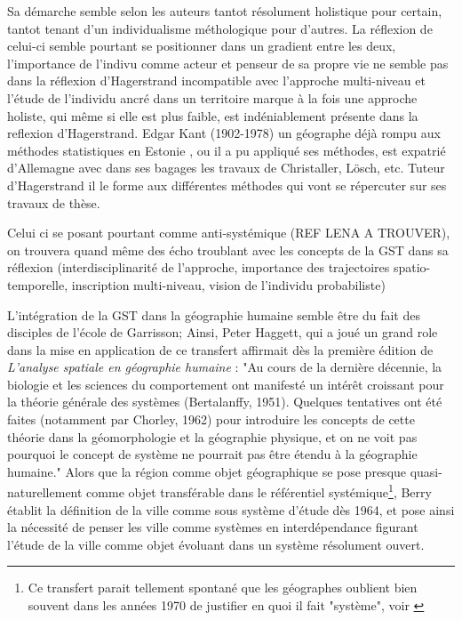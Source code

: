 {Sa démarche semble selon les auteurs tantot résolument holistique pour certain, tantot tenant d'un individualisme méthologique pour d'autres. La réflexion de celui-ci semble pourtant se positionner dans un gradient entre les deux, l'importance de l'indivu comme acteur et penseur de sa propre vie ne semble pas dans la réflexion d'Hagerstrand incompatible avec l'approche multi-niveau et l'étude de l'individu ancré dans un territoire marque à la fois une approche holiste, qui même si elle est plus faible, est indéniablement présente dans la reflexion d'Hagerstrand. Edgar Kant (1902-1978) un géographe déjà rompu aux méthodes statistiques en Estonie \autocite{Chabot1937} , ou il a pu appliqué ses méthodes, est expatrié d'Allemagne avec dans ses bagages les travaux de Christaller, Lösch, etc. Tuteur d'Hagerstrand il le forme aux différentes méthodes qui vont se répercuter sur ses travaux de thèse.

Celui ci se posant pourtant comme anti-systémique (REF LENA A TROUVER), on trouvera quand même des écho troublant avec les concepts de la GST dans sa réflexion (interdisciplinarité de l'approche, importance des trajectoires spatio-temporelle, inscription multi-niveau, vision de l'individu probabiliste)
 

L'intégration de la GST dans la géographie humaine semble être du fait des disciples de l'école de Garrisson; Ainsi, Peter Haggett, qui a joué un grand role dans la mise en application de ce transfert affirmait dès la première édition de \textit{L’analyse spatiale en géographie humaine} : "Au cours de la dernière décennie, la biologie et les sciences du comportement ont manifesté un intérêt croissant pour la théorie générale des systèmes (Bertalanffy, 1951). Quelques tentatives ont été faites (notamment par Chorley, 1962) pour introduire les concepts de cette théorie dans la géomorphologie et la géographie physique, et on ne voit pas pourquoi le concept de système ne pourrait pas être étendu à la géographie humaine." \autocite{Haggett1965} Alors que la région comme objet géographique se pose presque quasi-naturellement comme objet transférable dans le référentiel systémique\footnote{ Ce transfert parait tellement spontané que les géographes oublient bien souvent dans les années 1970 de justifier en quoi il fait "système", voir \autocite{Orain2001}}, Berry établit la définition de la ville comme sous système d'étude dès 1964, et pose ainsi la nécessité de penser les ville comme systèmes en interdépendance figurant l'étude de la ville comme objet évoluant dans un système résolument ouvert. 

}

